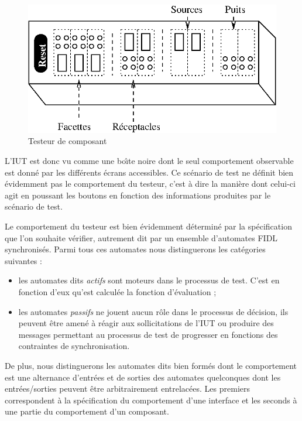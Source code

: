  \begin{figure}[htbp]
     \centering
     \includegraphics{figures/component-tester.eps}    
     \caption{Testeur de composant}
     \label{fig-tester-composant}
 \end{figure}

 L'\textsf{IUT} est donc  vu comme une
 bo\^{\i}te noire dont le seul comportement observable est donn\'e par
 les diff\'erents \'ecrans accessibles. Ce sc\'enario de test ne
 d\'efinit bien \'evidemment pas le comportement du testeur, c'est
 \`a dire la mani\`ere dont celui-ci agit en poussant les boutons en
 fonction des informations produites par le sc\'enario de  test. 

Le comportement du testeur est bien \'evidemment d\'etermin\'e par
la sp\'ecification que l'on souhaite v\'erifier, autrement dit par
un ensemble d'automates \textsf{FIDL} synchronis\'es. Parmi tous ces
automates nous distinguerons les cat\'egories suivantes :  
\begin{itemize}
  \item les automates dits \emph{actifs} sont moteurs dans le
  processus de test. C'est en fonction d'eux qu'est calcul\'ee la
  fonction d'\'evaluation ;
\item les automates \emph{passifs} ne jouent aucun r\^ole dans le
  processus de d\'ecision, ils peuvent \^etre amen\'e \`a
  r\'eagir  aux sollicitations de l'\textsf{IUT} ou produire des
  messages permettant au processus de test de progresser en fonctions
  des contraintes de synchronisation.
\end{itemize}

De plus, nous distinguerons les automates dits bien form\'es  dont le
comportement est une alternance d'entr\'ees et de sorties des
automates quelconques dont les entr\'ees/sorties peuvent \^etre
arbitrairement entrelac\'ees. Les premiers correspondent \`a la
sp\'ecification du comportement d'une interface et les seconds \`a
une partie du comportement d'un composant.

